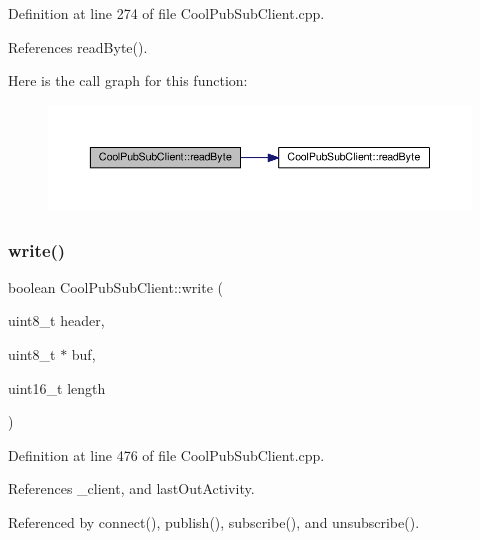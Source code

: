 Definition at line 274 of file Cool\+Pub\+Sub\+Client.\+cpp.



References read\+Byte().

Here is the call graph for this function\+:
\nopagebreak
\begin{figure}[H]
\begin{center}
\leavevmode
\includegraphics[width=350pt]{d8/d4b/class_cool_pub_sub_client_abef3735bb9a2a8c87b3da659dc4ade03_cgraph}
\end{center}
\end{figure}
\mbox{\label{class_cool_pub_sub_client_a7a8e4854a1846eaa668046d3854d47ad}} 
\subsubsection{\texorpdfstring{write()}{write()}}
{\footnotesize\ttfamily boolean Cool\+Pub\+Sub\+Client\+::write (\begin{DoxyParamCaption}\item[{uint8\+\_\+t}]{header,  }\item[{uint8\+\_\+t $\ast$}]{buf,  }\item[{uint16\+\_\+t}]{length }\end{DoxyParamCaption})\hspace{0.3cm}{\ttfamily [private]}}



Definition at line 476 of file Cool\+Pub\+Sub\+Client.\+cpp.



References \+\_\+client, and last\+Out\+Activity.



Referenced by connect(), publish(), subscribe(), and unsubscribe().

